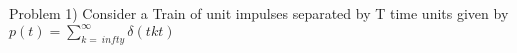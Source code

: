 

Problem 1) Consider a Train of unit impulses separated by T time units given by $p(t) = \sum\limits_{k=\
infty}^{\infty} \delta(tkt)$

